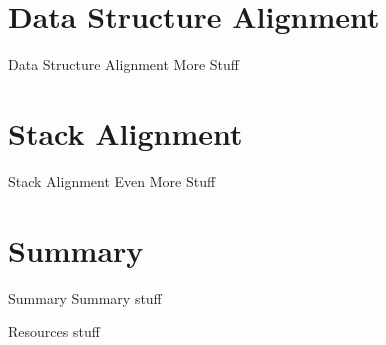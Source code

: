 \documentclass{beamer}
\begin{document}
\section{Data Structure Alignment}
\begin{frame}{Data Structure Alignment}
	More Stuff
\end{frame}

\section{Stack Alignment}
\begin{frame}{Stack Alignment}
	Even More Stuff
\end{frame}

\section{Summary}
\begin{frame}{Summary}
	Summary stuff
\end{frame}

\begin{frame}{Resources}
	stuff
\end{frame}
\end{document}

